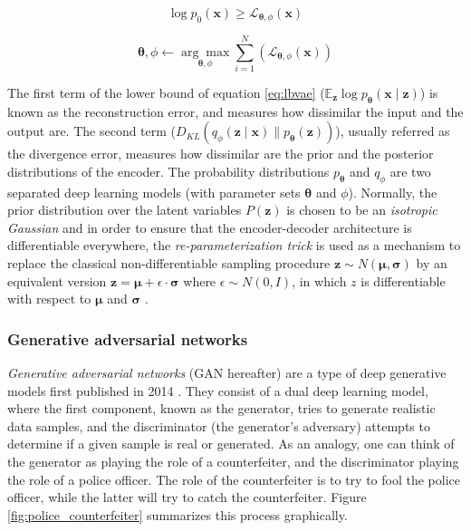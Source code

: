 \begin{equation}
\label{eq:vaelbasloss}
\log p_{0}(\mathbf{x}) \geq \mathcal{L}_{\mathbf{\theta}, \phi}\left(\mathbf{x}\right)
\end{equation}

\begin{equation}
\label{eq:vaeopt}
\mathbf{\theta}, \phi \leftarrow \underset{\mathbf{\theta}, \phi}{\arg \max } \sum_{i=1}^{N}\left(\mathcal{L}_{\mathbf{\theta}, \phi}(\mathbf{x})\right)
\end{equation}

The first term of the lower bound of equation \ref{eq:lbvae} ($\mathbb{E}_{\mathbf{z}} \log p_{\mathbf{\theta}}(\mathbf{x} \mid \mathbf{z})$) is known as the reconstruction error, and measures how dissimilar the input and the output are. The second term ($D_{K L}\left(q_{\phi}(\mathbf{z} \mid \mathbf{x}) \| p_{\mathbf{\theta}}(\mathbf{z})\right)$), usually referred as the divergence error, measures how dissimilar are the prior and the posterior distributions of the encoder. The probability distributions $p_\mathbf{\theta}$ and $q_\phi$ are two separated deep learning models (with parameter sets $\mathbf{\theta}$ and $\phi$). Normally, the prior distribution over the latent variables $P(\mathbf{z})$ is chosen to be an \textit{isotropic Gaussian} \autocite{wei2021} and in order to ensure that the encoder-decoder architecture is differentiable everywhere, the \textit{re-parameterization trick} is used as a mechanism to replace the classical non-differentiable sampling procedure $\mathbf{z} \sim N(\mathbf{\mu}, \mathbf{\sigma})$ by an equivalent version $\mathbf{z} = \mathbf{\mu} + \epsilon \cdot \mathbf{\sigma}$ where $\epsilon \sim N(0,I)$, in which $z$ is differentiable with respect to $\mathbf{\mu}$ and $\mathbf{\sigma}$ \autocite{kingma2019}.


\subsubsection{Generative adversarial networks}
\textit{Generative adversarial networks} (GAN hereafter) are a type of deep generative models first published in 2014 \autocite{Goodfellow2014}. They consist of a dual deep learning model, where the first component, known as the generator, tries to generate realistic data samples, and the discriminator (the generator's adversary) attempts to determine if a given sample is real or generated. As an analogy, one can think of the generator as playing the role of a counterfeiter, and the discriminator playing the role of a police officer. The role of the counterfeiter is to try to fool the police officer, while the latter will try to catch the counterfeiter. Figure \ref{fig:police_counterfeiter} summarizes this process graphically.

